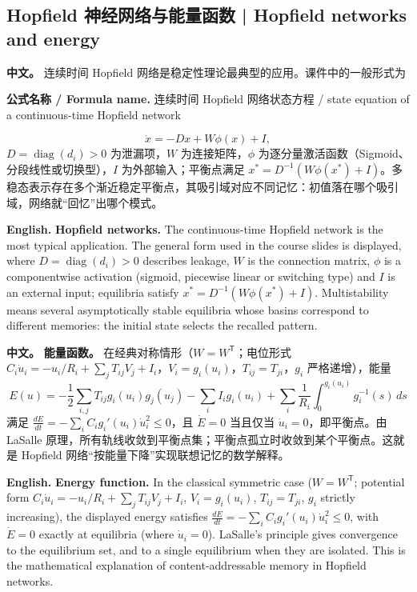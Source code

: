 \documentclass[UTF8,11pt,a4paper]{ctexart}
\newcommand{\FORMULA}[2]{\par\noindent\textbf{公式名称 / Formula name.} #1 / #2\par}
\newcommand{\APS}[2]{\par\noindent\textbf{中文。} #1\par\noindent\textbf{English.} #2\par}
\begin{document}
\subsection{Hopfield 神经网络与能量函数 | Hopfield networks and energy}
\APS{连续时间 Hopfield 网络是稳定性理论最典型的应用。课件中的一般形式为
\FORMULA{连续时间 Hopfield 网络状态方程}{state equation of a continuous-time Hopfield network}
\[
\dot x=-Dx+W\phi(x)+I,
\]
$D=\operatorname{diag}(d_i)>0$ 为泄漏项，$W$ 为连接矩阵，$\phi$ 为逐分量激活函数（Sigmoid、分段线性或切换型），$I$ 为外部输入；平衡点满足 $x^*=D^{-1}(W\phi(x^*)+I)$。多稳态表示存在多个渐近稳定平衡点，其吸引域对应不同记忆：初值落在哪个吸引域，网络就“回忆”出哪个模式。}{\textbf{Hopfield networks.} The continuous-time Hopfield network is the most typical application. The general form used in the course slides is displayed, where $D=\operatorname{diag}(d_i)>0$ describes leakage, $W$ is the connection matrix, $\phi$ is a componentwise activation (sigmoid, piecewise linear or switching type) and $I$ is an external input; equilibria satisfy $x^*=D^{-1}(W\phi(x^*)+I)$. Multistability means several asymptotically stable equilibria whose basins correspond to different memories: the initial state selects the recalled pattern.}

\APS{\textbf{能量函数。} 在经典对称情形（$W=W^{\mathsf T}$；电位形式 $C_i\dot u_i=-u_i/R_i+\sum_jT_{ij}V_j+I_i$，$V_i=g_i(u_i)$，$T_{ij}=T_{ji}$，$g_i$ 严格递增），能量
\[
E(u)=-\frac12\sum_{i,j}T_{ij}g_i(u_i)g_j(u_j)-\sum_iI_ig_i(u_i)
+\sum_i\frac1{R_i}\int_0^{g_i(u_i)}g_i^{-1}(s)\,ds
\]
满足 $\frac{dE}{dt}=-\sum_iC_ig_i'(u_i)\dot u_i^2\le0$，且 $\dot E=0$ 当且仅当 $\dot u_i=0$，即平衡点。由 LaSalle 原理，所有轨线收敛到平衡点集；平衡点孤立时收敛到某个平衡点。这就是 Hopfield 网络“按能量下降”实现联想记忆的数学解释。}{\textbf{Energy function.} In the classical symmetric case ($W=W^{\mathsf T}$; potential form $C_i\dot u_i=-u_i/R_i+\sum_jT_{ij}V_j+I_i$, $V_i=g_i(u_i)$, $T_{ij}=T_{ji}$, $g_i$ strictly increasing), the displayed energy satisfies $\frac{dE}{dt}=-\sum_iC_ig_i'(u_i)\dot u_i^2\le0$, with $\dot E=0$ exactly at equilibria (where $\dot u_i=0$). LaSalle's principle gives convergence to the equilibrium set, and to a single equilibrium when they are isolated. This is the mathematical explanation of content-addressable memory in Hopfield networks.}
\end{document}
